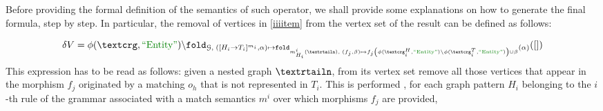 Before providing the formal definition of the semantics of such operator, we shall provide some explanations on how to generate the final formula, step by step. In particular, the removal of vertices  in \ref{iiiitem} from the vertex set of the result can be defined as follows:

\begin{equation}\label{eq:deltav}
\delta V=\phi(\ngraph,\ONTA)\backslash\texttt{fold}_{\mathcal{G},\;([H_i\to T_i]^{m_i},\alpha)\mapsto \texttt{fold}_{m^i_{H_i}(\nested),\;(f_j,\beta)\mapsto f_j\left(\phi(\ngraph_i^H,\ONTA)\backslash\phi(\ngraph_i^T,\ONTA)\right)\cup\beta }(\alpha)}([])
\end{equation}
This expression has to be read as follows: given a nested graph $\nested$, from its vertex set remove all those vertices that appear in the morphism $f_j$ originated by a matching $o_h$ that is not represented in $T_i$. This is performed , for each graph pattern $H_i$ belonging to the $i$-th rule of the grammar associated with a match semantics $m^i$ over which morphisms $f_j$ are provided,


